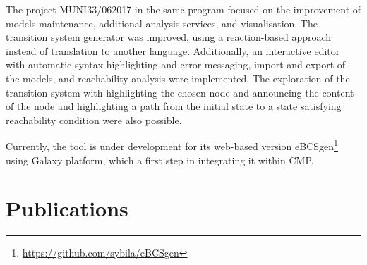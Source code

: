\documentclass[11pt,a4paper]{report}
\begin{document}
The project MUNI33/062017 in the same program focused on the improvement of models maintenance, additional analysis services, and visualisation. The transition system generator was improved, using a reaction-based approach instead of translation to another language. Additionally, an interactive editor with automatic syntax highlighting and error messaging, import and export of the models, and reachability analysis were implemented. The exploration of the transition system with highlighting the chosen node and announcing the content of the node and highlighting a path from the initial state to a state satisfying reachability condition were also possible.

Currently, the tool is under development for its web-based version eBCSgen\footnote{\href{https://github.com/sybila/eBCSgen}{https://github.com/sybila/eBCSgen}} using Galaxy platform, which a first step in integrating it within CMP.

\chapter{Publications}
\end{document}
